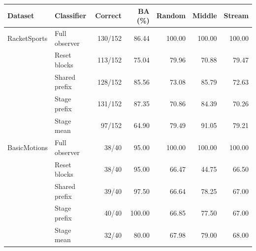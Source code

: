 \begin{tabular}{llrrrrr}\toprule
Dataset & Classifier & Correct & BA (\%) & Random & Middle & Stream \\\midrule
RacketSports & Full observer & 130/152 & 86.44 & 100.00 & 100.00 & 100.00 \\
 & Reset blocks & 113/152 & 75.04 & 79.96 & 70.88 & 79.47 \\
 & Shared prefix & 128/152 & 85.56 & 73.08 & 85.79 & 72.63 \\
 & Stage prefix & 131/152 & 87.35 & 70.86 & 84.39 & 70.26 \\
 & Stage mean & 97/152 & 64.90 & 79.49 & 91.05 & 79.21 \\
\midrule
BasicMotions & Full observer & 38/40 & 95.00 & 100.00 & 100.00 & 100.00 \\
 & Reset blocks & 38/40 & 95.00 & 66.47 & 44.75 & 66.50 \\
 & Shared prefix & 39/40 & 97.50 & 66.64 & 78.25 & 67.00 \\
 & Stage prefix & 40/40 & 100.00 & 66.85 & 77.50 & 67.00 \\
 & Stage mean & 32/40 & 80.00 & 67.98 & 79.00 & 68.00 \\
\bottomrule\end{tabular}

